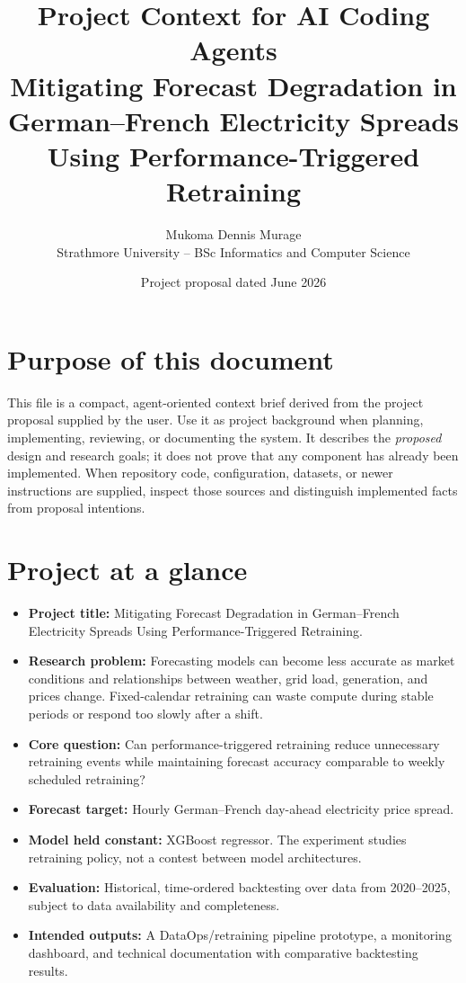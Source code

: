 \documentclass[11pt,a4paper]{article}
\title{Project Context for AI Coding Agents\\[0.4em]
\large Mitigating Forecast Degradation in German--French Electricity Spreads Using Performance-Triggered Retraining}
\author{Mukoma Dennis Murage \\ Strathmore University -- BSc Informatics and Computer Science}
\date{Project proposal dated June 2026}
\begin{document}
\maketitle

\section*{Purpose of this document}
This file is a compact, agent-oriented context brief derived from the project proposal supplied by the user. Use it as project background when planning, implementing, reviewing, or documenting the system. It describes the \emph{proposed} design and research goals; it does not prove that any component has already been implemented. When repository code, configuration, datasets, or newer instructions are supplied, inspect those sources and distinguish implemented facts from proposal intentions.

\section{Project at a glance}
\begin{itemize}
  \item \textbf{Project title:} Mitigating Forecast Degradation in German--French Electricity Spreads Using Performance-Triggered Retraining.
  \item \textbf{Research problem:} Forecasting models can become less accurate as market conditions and relationships between weather, grid load, generation, and prices change. Fixed-calendar retraining can waste compute during stable periods or respond too slowly after a shift.
  \item \textbf{Core question:} Can performance-triggered retraining reduce unnecessary retraining events while maintaining forecast accuracy comparable to weekly scheduled retraining?
  \item \textbf{Forecast target:} Hourly German--French day-ahead electricity price spread.
  \item \textbf{Model held constant:} XGBoost regressor. The experiment studies retraining policy, not a contest between model architectures.
  \item \textbf{Evaluation:} Historical, time-ordered backtesting over data from 2020--2025, subject to data availability and completeness.
  \item \textbf{Intended outputs:} A DataOps/retraining pipeline prototype, a monitoring dashboard, and technical documentation with comparative backtesting results.
\end{itemize}
\end{document}
